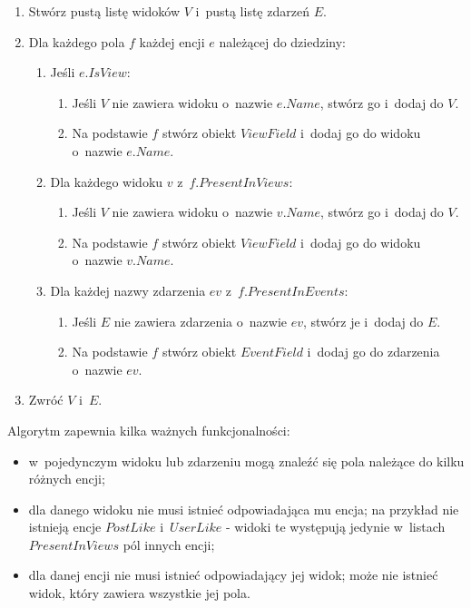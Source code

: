 \begin{enumerate}
 \item Stwórz pustą listę widoków $V$ i~pustą listę zdarzeń $E$.
 \item Dla każdego pola $f$ każdej encji $e$ należącej do dziedziny:
  \begin{enumerate}
   \item Jeśli $e.IsView$:
    \begin{enumerate}
     \item Jeśli $V$ nie zawiera widoku o~nazwie $e.Name$, stwórz go i~dodaj do $V$.
     \item Na podstawie $f$ stwórz obiekt $ViewField$ i~dodaj go do widoku o~nazwie $e.Name$.
    \end{enumerate}
   \item Dla każdego widoku $v$ z~$f.PresentInViews$:
    \begin{enumerate}
     \item Jeśli $V$ nie zawiera widoku o~nazwie $v.Name$, stwórz go i~dodaj do $V$.
     \item Na podstawie $f$ stwórz obiekt $ViewField$ i~dodaj go do widoku o~nazwie $v.Name$.
    \end{enumerate}
   \item Dla każdej nazwy zdarzenia $ev$ z~$f.PresentInEvents$:
    \begin{enumerate}
     \item Jeśli $E$ nie zawiera zdarzenia o~nazwie $ev$, stwórz je i~dodaj do $E$.
     \item Na podstawie $f$ stwórz obiekt $EventField$ i~dodaj go do zdarzenia o~nazwie $ev$.
    \end{enumerate}
  \end{enumerate}
 \item Zwróć $V$ i~$E$.
\end{enumerate}

Algorytm zapewnia kilka ważnych funkcjonalności:

\begin{itemize}
 \item w~pojedynczym widoku lub zdarzeniu mogą znaleźć się pola należące do kilku różnych encji;
 \item dla danego widoku nie musi istnieć odpowiadająca mu encja; na przykład nie istnieją encje $PostLike$ i~$UserLike$ - widoki te występują jedynie w~listach $PresentInViews$ pól innych encji;
 \item dla danej encji nie musi istnieć odpowiadający jej widok; może nie istnieć widok, który zawiera wszystkie jej pola.
\end{itemize}



